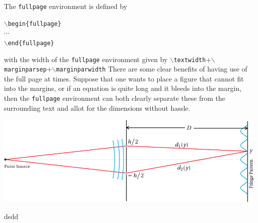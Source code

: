 \documentclass[]{subook}
\begin{document}
\begin{fullpage}
    The \texttt{fullpage} environment is defined by
    \begin{center}
        \texttt{$\backslash$begin\{fullpage\}}\\
        $\cdots$\\
        \texttt{$\backslash$end\{fullpage\}}
    \end{center}
    with the width of the \texttt{fullpage} environment given by \texttt{$\backslash$textwidth}+\texttt{$\backslash$marginparsep}+\texttt{$\backslash$marginparwidth}
    There are some clear benefits of having use of the full page at times. Suppose that one wants to place a figure that cannot fit into the margins, or if an equation is quite long and it bleeds into
     the margin, 
    then the \texttt{fullpage} environment can both clearly separate these from the surrounding text and allot for the dimensions without hassle. 

    \centering
        \includegraphics{img/f08Young.pdf}
        \label{fig:example} %
    \begin{definition}
        dsdd
    \end{definition}
\end{fullpage}
\end{document}
